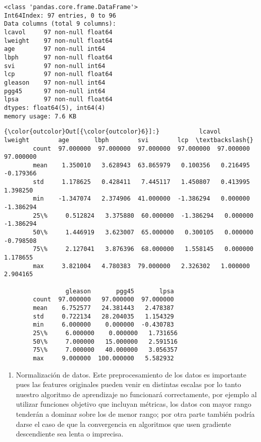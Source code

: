 \documentclass[11pt]{article}
\begin{document}
    \begin{Verbatim}[commandchars=\\\{\}]
<class 'pandas.core.frame.DataFrame'>
Int64Index: 97 entries, 0 to 96
Data columns (total 9 columns):
lcavol     97 non-null float64
lweight    97 non-null float64
age        97 non-null int64
lbph       97 non-null float64
svi        97 non-null int64
lcp        97 non-null float64
gleason    97 non-null int64
pgg45      97 non-null int64
lpsa       97 non-null float64
dtypes: float64(5), int64(4)
memory usage: 7.6 KB

    \end{Verbatim}

            \begin{Verbatim}[commandchars=\\\{\}]
{\color{outcolor}Out[{\color{outcolor}6}]:}           lcavol    lweight        age       lbph        svi        lcp  \textbackslash{}
        count  97.000000  97.000000  97.000000  97.000000  97.000000  97.000000   
        mean    1.350010   3.628943  63.865979   0.100356   0.216495  -0.179366   
        std     1.178625   0.428411   7.445117   1.450807   0.413995   1.398250   
        min    -1.347074   2.374906  41.000000  -1.386294   0.000000  -1.386294   
        25\%     0.512824   3.375880  60.000000  -1.386294   0.000000  -1.386294   
        50\%     1.446919   3.623007  65.000000   0.300105   0.000000  -0.798508   
        75\%     2.127041   3.876396  68.000000   1.558145   0.000000   1.178655   
        max     3.821004   4.780383  79.000000   2.326302   1.000000   2.904165   
        
                 gleason       pgg45       lpsa  
        count  97.000000   97.000000  97.000000  
        mean    6.752577   24.381443   2.478387  
        std     0.722134   28.204035   1.154329  
        min     6.000000    0.000000  -0.430783  
        25\%     6.000000    0.000000   1.731656  
        50\%     7.000000   15.000000   2.591516  
        75\%     7.000000   40.000000   3.056357  
        max     9.000000  100.000000   5.582932  
\end{Verbatim}
        
    \begin{enumerate}
\def\labelenumi{(\alph{enumi})}
\setcounter{enumi}{2}
\itemsep1pt\parskip0pt
\item
  Normalización de datos. Este preprocesamiento de los datos es
  importante pues las features originales pueden venir en distintas
  escalas por lo tanto nuestro algoritmo de aprendizaje no funcionará
  correctamente, por ejemplo al utilizar funciones objetivo que incluyan
  métricas, los datos con mayor rango tenderán a dominar sobre los de
  menor rango; por otra parte también podría darse el caso de que la
  convergencia en algoritmos que usen gradiente descendiente sea lenta o
  imprecisa.
\end{enumerate}
\end{document}
